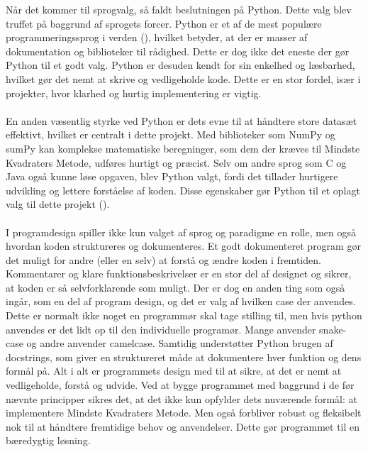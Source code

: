 Når det kommer til sprogvalg, så faldt beslutningen på Python. Dette valg blev truffet på baggrund af sprogets forcer. Python er et af de mest populære programmeringssprog i verden (\cite{tiobeIndex}), hvilket betyder, at der er masser af dokumentation og biblioteker til rådighed. Dette er dog ikke det eneste der gør Python til et godt valg. Python er desuden kendt for sin enkelhed og læsbarhed, hvilket gør det nemt at skrive og vedligeholde kode. Dette er en stor fordel, især i projekter, hvor klarhed og hurtig implementering er vigtig. \\\\
En anden væsentlig styrke ved Python er dets evne til at håndtere store datasæt effektivt, hvilket er centralt i dette projekt. Med biblioteker som NumPy og sumPy kan komplekse matematiske beregninger, som dem der kræves til Mindste Kvadraters Metode, udføres hurtigt og præcist. Selv om andre sprog som C og Java også kunne løse opgaven, blev Python valgt, fordi det tillader hurtigere udvikling og lettere forståelse af koden. Disse egenskaber gør Python til et oplagt valg til dette projekt (\cite{simplilearn}). \\\\
I programdesign spiller ikke kun valget af sprog og paradigme en rolle, men også hvordan koden struktureres og dokumenteres. Et godt dokumenteret program gør det muligt for andre (eller en selv) at forstå og ændre koden i fremtiden. Kommentarer og klare funktionsbeskrivelser er en stor del af designet og sikrer, at koden er så selvforklarende som muligt. Der er dog en anden ting som også ingår, som en del af program design, og det er valg af hvilken case der anvendes. Dette er normalt ikke noget en programmør skal tage stilling til, men hvis python anvendes er det lidt op til den individuelle programør. Mange anvender snake-case og andre anvender camelcase. Samtidig understøtter Python brugen af docstrings, som giver en struktureret måde at dokumentere hver funktion og dens formål på.
Alt i alt er programmets design med til at sikre, at det er nemt at vedligeholde, forstå og udvide. Ved at bygge programmet med baggrund i de før nævnte principper sikres det, at det ikke kun opfylder dets nuværende formål: at implementere Mindste Kvadraters Metode. Men også forbliver robust og fleksibelt nok til at håndtere fremtidige behov og anvendelser. Dette gør programmet til en bæredygtig løsning.

